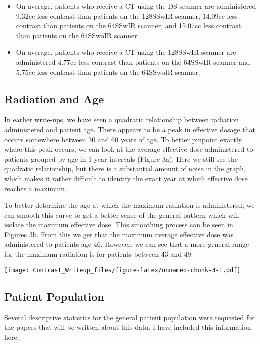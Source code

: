 \documentclass[]{article}
\begin{document}
\begin{itemize}
\item On average, patients who receive a CT using the DS scanner are administered 9.32cc less contrast than patients on the 128SSwIR scanner, 14.09cc less contrast than patients on the 64SSwIR scanner, and 15.07cc less contrast than patients on the 64SSwoIR scanner
\item On average, patients who receive a CT using the 128SSwIR scanner are administered 4.77cc less contrast than patients on the 64SSwIR scanner and 5.75cc less contrast than patients on the 64SSwoIR scanner.
\end{itemize}

\subsection{Radiation and Age}\label{radiation-and-age}

In earlier write-ups, we have seen a quadratic relationship between
radiation administered and patient age. There appears to be a peak in
effective dosage that occurs somewhere between 30 and 60 years of age.
To better pinpoint exactly where this peak occurs, we can look at the
average effective dose administered to patients grouped by age in 1-year
intervals (Figure 3a). Here we still see the quadratic relationship, but
there is a substantial amount of noise in the graph, which makes it
rather difficult to identify the exact year at which effective dose
reaches a maximum.

To better determine the age at which the maximum radiation is
administered, we can smooth this curve to get a better sense of the
general pattern which will isolate the maximum effective dose. This
smoothing process can be seen in Figures 3b. From this we get that the
maximum average effective dose was administered to patients age 46.
However, we can see that a more general range for the maximum radiation
is for patients between 43 and 49.

\texttt{[image: Contrast\_Writeup\_files/figure-latex/unnamed-chunk-3-1.pdf]}

\newpage

\subsection{Patient Population}\label{patient-population}

Several descriptive statistics for the general patient population were
requested for the papers that will be written about this data. I have
included this information here.
\end{document}
